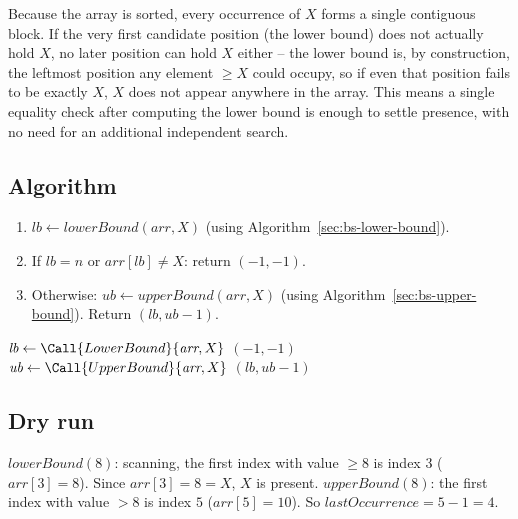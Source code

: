 Because the array is sorted, every occurrence of $X$ forms a single
contiguous block. If the very first candidate position (the lower bound)
does not actually hold $X$, no later position can hold $X$ either -- the
lower bound is, by construction, the leftmost position any element $\ge X$
could occupy, so if even that position fails to be exactly $X$, $X$ does
not appear anywhere in the array. This means a single equality check after
computing the lower bound is enough to settle presence, with no need for
an additional independent search.

\subsection*{Algorithm}

\begin{enumerate}
  \item $\textit{lb} \gets \textit{lowerBound}(\textit{arr}, X)$ (using
        Algorithm~\ref{sec:bs-lower-bound}).
  \item If $\textit{lb} = n$ or $\textit{arr}[\textit{lb}] \ne X$: return
        $(-1, -1)$.
  \item Otherwise: $\textit{ub} \gets \textit{upperBound}(\textit{arr}, X)$
        (using Algorithm~\ref{sec:bs-upper-bound}). Return
        $(\textit{lb}, \textit{ub} - 1)$.
\end{enumerate}

\begin{algorithm}[H]
\caption{First and Last Occurrence}
\begin{algorithmic}[1]
  \State $\textit{lb} \gets \Call{LowerBound}{\textit{arr}, X}$
    \State \Return $(-1, -1)$
  \EndIf
  \State $\textit{ub} \gets \Call{UpperBound}{\textit{arr}, X}$
  \State \Return $(\textit{lb}, \textit{ub} - 1)$
\EndProcedure
\end{algorithmic}
\end{algorithm}

\subsection*{Dry run}


$\textit{lowerBound}(8)$: scanning, the first index with value $\ge 8$ is
index $3$ ($\textit{arr}[3]=8$). Since $\textit{arr}[3]=8=X$, $X$ is
present. $\textit{upperBound}(8)$: the first index with value $>8$ is
index $5$ ($\textit{arr}[5]=10$). So
$\textit{lastOccurrence} = 5 - 1 = 4$.

